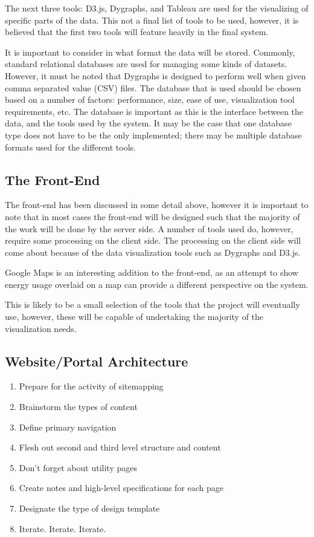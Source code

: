\documentclass[12pt,onecolumn]{IEEEtran}
\begin{document}
The next three tools: D3.js, Dygraphs, and Tableau are used for the visualizing of specific parts of the data. This not a final list of tools to be used, however, it is believed that the first two tools will feature heavily in the final system. 

It is important to consider in what format the data will be stored. Commonly, standard relational databases are used for managing some kinds of datasets. However, it must be noted that Dygraphs is designed to perform well when given comma separated value (CSV) files. The database that is used should be chosen based on a number of factors: performance, size, ease of use, visualization tool requirements, etc. 
The database is important as this is the interface between the data, and the tools used by the system. It may be the case that one database type does not have to be the only implemented; there may be multiple database formats used for the different tools.  

\subsection{The Front-End} \label{sec:TheFrontEnd}
The front-end has been discussed in some detail above, however it is important to note that in most cases the front-end will be designed such that the majority of the work will be done by the server side. A number of tools used do, however, require some processing on the client side. The processing on the client side will come about because of the data visualization tools such as Dygraphs and D3.js. 

Google Maps is an interesting addition to the front-end, as an attempt to show energy usage overlaid on a map can provide a different perspective on the system.

This is likely to be a small selection of the tools that the project will eventually use, however, these will be capable of undertaking the majority of the visualization needs.

\subsection{Website/Portal Architecture} \label{sec:WebsiteArchitecture}

\begin{enumerate}
\item Prepare for the activity of sitemapping
\item Brainstorm the types of content
\item Define primary navigation
\item Flesh out second and third level structure and content
\item Don’t forget about utility pages
\item Create notes and high-level specifications for each page
\item Designate the type of design template
\item Iterate. Iterate. Iterate.
\end{enumerate}
\end{document}
